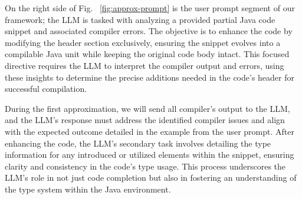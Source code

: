 On the right side of Fig. ~\ref{fig:approx-prompt} is the user prompt segment of our framework; the LLM is tasked with analyzing a provided partial Java code snippet and associated compiler errors. The objective is to enhance the code by modifying the header section exclusively, ensuring the snippet evolves into a compilable Java unit while keeping the original code body intact. This focused directive requires the LLM to interpret the compiler output and errors, using these insights to determine the precise additions needed in the code's header for successful compilation.

During the first approximation, we will send all compiler's output to the LLM, and the LLM's response must address the identified compiler issues and align with the expected outcome detailed in the example from the user prompt. After enhancing the code, the LLM's secondary task involves detailing the type information for any introduced or utilized elements within the snippet, ensuring clarity and consistency in the code's type usage. This process underscores the LLM's role in not just code completion but also in fostering an understanding of the type system within the Java environment.





